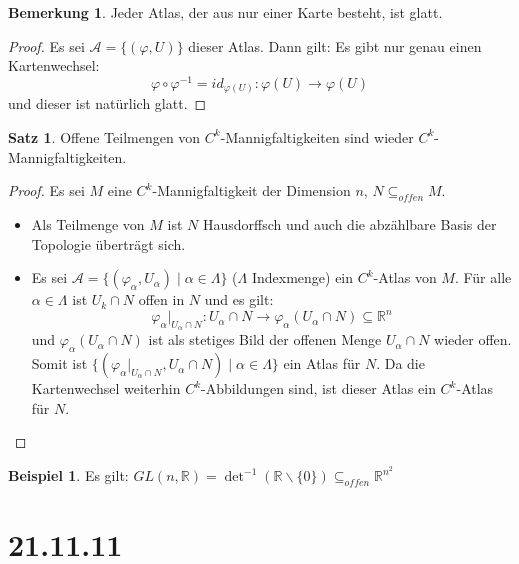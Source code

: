 \documentclass[a4paper,11pt,notitlepage]{report}
\theoremstyle{definition}
\newtheorem{theorem}{Satz}[chapter]
\newtheorem{remark}{Bemerkung}[chapter]
\newtheorem{example}{Beispiel}[chapter]
\newcommand{\R}{{\ensuremath{\mathbb{R}}}}
\begin{document}
\begin{remark}
	Jeder Atlas, der aus nur einer Karte besteht, ist glatt.
\end{remark}

\begin{proof}
	Es sei $\mathcal{A} = \{(\varphi,U)\}$ dieser Atlas. Dann gilt:
	\newline
	Es gibt nur genau einen Kartenwechsel: 
	$$\varphi \circ \varphi^{-1} = id_{\varphi(U)} \colon \varphi(U) \rightarrow \varphi(U)$$ und dieser ist natürlich glatt.
\end{proof}

\begin{theorem}
	Offene Teilmengen von $C^k$-Mannigfaltigkeiten sind wieder $C^k$-Mannigfaltigkeiten.
\end{theorem}

\begin{proof}
	Es sei $M$ eine $C^k$-Mannigfaltigkeit der Dimension $n$, $N \subseteq_{offen} M$.
	\begin{itemize}
		\item Als Teilmenge von $M$ ist $N$ Hausdorffsch und auch die abzählbare Basis der Topologie überträgt sich.
		\item Es sei $\mathcal{A} = \{(\varphi_\alpha, U_\alpha) \mid \alpha \in \Lambda \}$ ($\Lambda$ Indexmenge) ein $C^k$-Atlas von $M$.
		\newline
		Für alle $\alpha \in \Lambda$ ist $U_k \cap N$ offen in $N$ und es gilt:
		$$\varphi_\alpha \big |_{U_\alpha \cap N} \colon U_\alpha \cap N \rightarrow \varphi_\alpha(U_\alpha \cap N) \subseteq \R^n$$
		und $\varphi_\alpha(U_\alpha \cap N)$ ist als stetiges Bild der offenen Menge $U_\alpha \cap N$ wieder offen.
		\newline
		Somit ist $\{(\varphi_\alpha \big |_{U_\alpha \cap N}, U_\alpha \cap N) \mid \alpha \in \Lambda\}$ ein Atlas für $N$.
		\newline
		Da die Kartenwechsel weiterhin $C^k$-Abbildungen sind, ist dieser Atlas ein $C^k$-Atlas für $N$.
	\end{itemize}
\end{proof}

\begin{example}
	Es gilt: $GL(n,\R) = \det^{-1}(\R \backslash \{0\}) \subseteq_{offen} \R^{n^2}$
\end{example}

\chapter{21.11.11}
\end{document}
